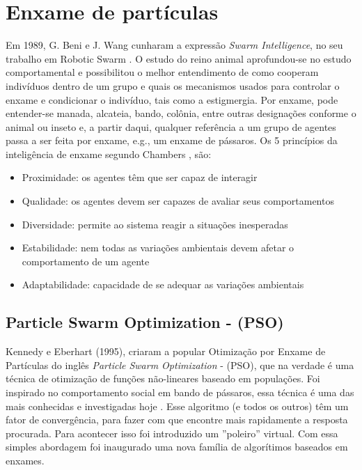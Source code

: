 \documentclass[conference,compsoc]{IEEEtran}
\begin{document}
\section{Enxame de partículas}\label{arte:enxames}

Em 1989, G. Beni e J. Wang cunharam a expressão \textit{Swarm Intelligence}, no seu
trabalho em Robotic Swarm \cite{SRobotics}. O estudo do reino animal aprofundou-se no estudo
comportamental e possibilitou o melhor entendimento de como cooperam indivíduos dentro de um grupo e
quais os mecanismos usados para controlar o enxame e condicionar o indivíduo, tais como a estigmergia. 
Por enxame, pode entender-se manada, alcateia, bando, colônia, entre outras designações conforme o animal 
ou inseto e, a partir daqui, qualquer referência a um grupo de agentes passa a ser feita por enxame, e.g., 
um enxame de pássaros. Os 5 princípios da inteligência de enxame segundo  Chambers \cite{chambers2014computer}, são:
\begin{itemize}
	\item{Proximidade: os agentes têm que ser capaz de interagir}
	\item{Qualidade: os agentes devem ser capazes de avaliar seus comportamentos}
	\item{Diversidade: permite ao sistema reagir a situações inesperadas}
	\item{Estabilidade: nem todas as variações ambientais devem afetar o comportamento de um agente}
	\item{Adaptabilidade: capacidade de se adequar as variações ambientais}
\end{itemize}


\subsection{Particle Swarm Optimization - (PSO)}\label{arte:algo:pso}

Kennedy e Eberhart (1995), criaram a popular Otimização por Enxame de Partículas do inglês \textit{Particle Swarm Optimization} - (PSO), 
que na verdade é uma técnica de otimização de funções não-lineares baseado em populações. Foi inspirado no comportamento
social em bando de pássaros, essa técnica é uma das mais conhecidas e investigadas hoje \cite{Kennedy1995}.
Esse algoritmo (e todos os outros) têm um fator de convergência, para fazer com que encontre mais rapidamente a resposta procurada.
Para acontecer isso foi introduzido um ''poleiro'' virtual. Com essa simples abordagem foi inaugurado uma nova
família de algorítimos baseados em enxames. 
\end{document}
